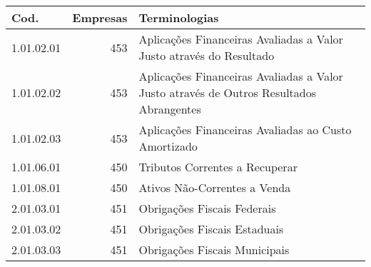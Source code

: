 \begin{table}[ht]
\centering
\begin{tabular}{lrl}
  \hline
Cod. & Empresas & Terminologias \\ 
  \hline
1.01.02.01 & 453 & Aplicações Financeiras Avaliadas a Valor Justo através do Resultado \\ 
  1.01.02.02 & 453 & Aplicações Financeiras Avaliadas a Valor Justo através de Outros Resultados Abrangentes \\ 
  1.01.02.03 & 453 & Aplicações Financeiras Avaliadas ao Custo Amortizado \\ 
  1.01.06.01 & 450 & Tributos Correntes a Recuperar \\ 
  1.01.08.01 & 450 & Ativos Não-Correntes a Venda \\ 
  2.01.03.01 & 451 & Obrigações Fiscais Federais \\ 
  2.01.03.02 & 451 & Obrigações Fiscais Estaduais \\ 
  2.01.03.03 & 451 & Obrigações Fiscais Municipais \\ 
   \hline
\end{tabular}
\end{table}
